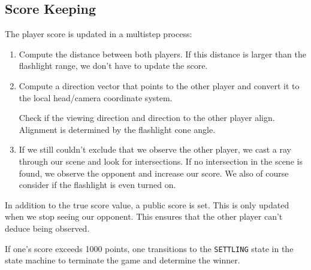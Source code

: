 \documentclass[11pt]{article}
\begin{document}
\subsection{Score Keeping}
\par The player score is updated in a multistep process:
\begin{enumerate}
	\item Compute the distance between both players. If this distance is larger than the flashlight range, we don't have to update the score.
	\item Compute a direction vector that points to the other player and convert it to the local head/camera coordinate system.
		\par Check if the viewing direction and direction to the other player align. Alignment is determined by the flashlight cone angle.
	\item If we still couldn't exclude that we observe the other player, we cast a ray through our scene and look for intersections. If no intersection in the scene is found, we observe the opponent and increase our score. We also of course consider if the flashlight is even turned on.
\end{enumerate}
\par In addition to the true score value, a public score is set. This is only updated when we stop seeing our opponent. This ensures that the other player can't deduce being observed.
\par If one's score exceeds 1000 points, one transitions to the \texttt{SETTLING} state in the state machine to terminate the game and determine the winner.
\end{document}
